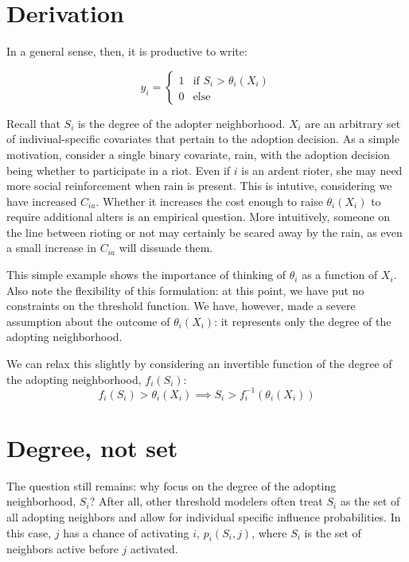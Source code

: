 \documentclass{article}
\begin{document}
\section{Derivation}

In a general sense, then, it is productive to write:

\[
y_i =
    \begin{cases}
       1 & \text{if } S_i > \theta_i(X_i) \\
       0 & \text{else}
      \end{cases}
\]

Recall that $S_i$ is the degree of the adopter neighborhood. $X_i$ are an arbitrary set of indiviual-specific covariates that pertain to the adoption decision. As a simple motivation, consider a single binary covariate, rain, with the adoption decision being whether to participate in a riot. Even if $i$ is an ardent rioter, she may need more social reinforcement when rain is present. This is intutive, considering we have increased $C_{ia}$. Whether it increases the cost enough to raise $\theta_i(X_i)$ to require additional alters is an empirical question. More intuitively, someone on the line between rioting or not may certainly be scared away by the rain, as even a small increase in $C_{ia}$ will dissuade them.

This simple example shows the importance of thinking of $\theta_i$ as a function of $X_i$. Also note the flexibility of this formulation: at this point, we have put no constraints on the threshold function. We have, however, made a severe assumption about the outcome of $\theta_i(X_i)$: it represents only the degree of the adopting neighborhood.

We can relax this slightly by considering an invertible function of the degree of the adopting neighborhood, $f_i(S_i)$:
\[
f_i(S_i) > \theta_i(X_i) \implies S_i > f_i^{-1}(\theta_i(X_i))
\]



\section{Degree, not set}

The question still remains: why focus on the degree of the adopting neighborhood, $S_i$? After all, other threshold modelers often treat $S_i$ as the set of all adopting neighbors and allow for individual specific influence probabilities. In this case, $j$ has a chance of activating $i$, $p_{i}(S_i, j)$, where $S_i$ is the set of neighbors active before $j$ activated. 
\end{document}
